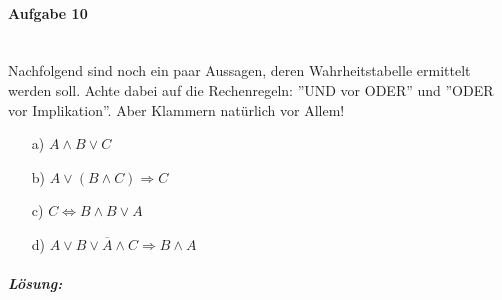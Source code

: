\documentclass[12pt,a4paper,ngerman]{scrartcl}
\begin{document}
	\paragraph{Aufgabe 10}\mbox{}\\
	Nachfolgend sind noch ein paar Aussagen, deren Wahrheitstabelle ermittelt werden soll. Achte dabei auf die Rechenregeln: ''UND vor ODER'' und ''ODER vor Implikation''. Aber Klammern natürlich vor Allem!
	\begin{itemize}
		\item[a)] $A \wedge B \vee C$
		\item[b)] $A \vee (B \wedge C) \Rightarrow C$
		\item[c)] $C \Leftrightarrow B \wedge B \vee A$
		\item[d)] $A \vee B \vee \overline{A} \wedge C \Rightarrow B \wedge A$
	\end{itemize}
	\subparagraph{Lösung:}
\end{document}
